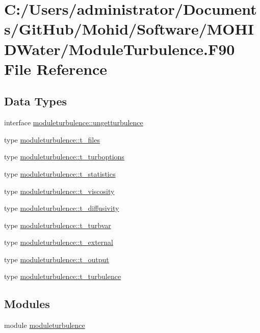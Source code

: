 \hypertarget{_module_turbulence_8_f90}{}\section{C\+:/\+Users/administrator/\+Documents/\+Git\+Hub/\+Mohid/\+Software/\+M\+O\+H\+I\+D\+Water/\+Module\+Turbulence.F90 File Reference}
\label{_module_turbulence_8_f90}
\subsection*{Data Types}
\begin{DoxyCompactItemize}
\item 
interface \mbox{\hyperlink{interfacemoduleturbulence_1_1ungetturbulence}{moduleturbulence\+::ungetturbulence}}
\item 
type \mbox{\hyperlink{structmoduleturbulence_1_1t__files}{moduleturbulence\+::t\+\_\+files}}
\item 
type \mbox{\hyperlink{structmoduleturbulence_1_1t__turboptions}{moduleturbulence\+::t\+\_\+turboptions}}
\item 
type \mbox{\hyperlink{structmoduleturbulence_1_1t__statistics}{moduleturbulence\+::t\+\_\+statistics}}
\item 
type \mbox{\hyperlink{structmoduleturbulence_1_1t__viscosity}{moduleturbulence\+::t\+\_\+viscosity}}
\item 
type \mbox{\hyperlink{structmoduleturbulence_1_1t__diffusivity}{moduleturbulence\+::t\+\_\+diffusivity}}
\item 
type \mbox{\hyperlink{structmoduleturbulence_1_1t__turbvar}{moduleturbulence\+::t\+\_\+turbvar}}
\item 
type \mbox{\hyperlink{structmoduleturbulence_1_1t__external}{moduleturbulence\+::t\+\_\+external}}
\item 
type \mbox{\hyperlink{structmoduleturbulence_1_1t__output}{moduleturbulence\+::t\+\_\+output}}
\item 
type \mbox{\hyperlink{structmoduleturbulence_1_1t__turbulence}{moduleturbulence\+::t\+\_\+turbulence}}
\end{DoxyCompactItemize}
\subsection*{Modules}
\begin{DoxyCompactItemize}
\item 
module \mbox{\hyperlink{namespacemoduleturbulence}{moduleturbulence}}
\end{DoxyCompactItemize}
